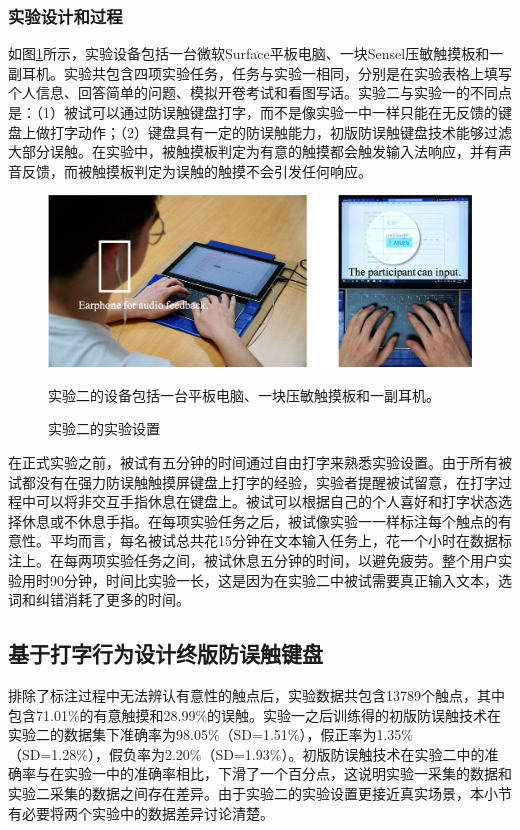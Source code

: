 \subsubsection{实验设计和过程}

如图\ref{fig:TypeBoard_study2_illu}所示，实验设备包括一台微软Surface平板电脑、一块Sensel压敏触摸板和一副耳机。实验共包含四项实验任务，任务与实验一相同，分别是在实验表格上填写个人信息、回答简单的问题、模拟开卷考试和看图写话。实验二与实验一的不同点是：（1）被试可以通过防误触键盘打字，而不是像实验一中一样只能在无反馈的键盘上做打字动作；（2）键盘具有一定的防误触能力，初版防误触键盘技术能够过滤大部分误触。在实验中，被触摸板判定为有意的触摸都会触发输入法响应，并有声音反馈，而被触摸板判定为误触的触摸不会引发任何响应。

\begin{figure}[!tbh]
	\includegraphics[width=1.0\linewidth]{figures/TypeBoard_study2_illu.png}
	\centering
	\caption*{实验二的设备包括一台平板电脑、一块压敏触摸板和一副耳机。}
	\caption{实验二的实验设置}
	\label{fig:TypeBoard_study2_illu}
\end{figure}

在正式实验之前，被试有五分钟的时间通过自由打字来熟悉实验设置。由于所有被试都没有在强力防误触触摸屏键盘上打字的经验，实验者提醒被试留意，在打字过程中可以将非交互手指休息在键盘上。被试可以根据自己的个人喜好和打字状态选择休息或不休息手指。在每项实验任务之后，被试像实验一一样标注每个触点的有意性。平均而言，每名被试总共花15分钟在文本输入任务上，花一个小时在数据标注上。在每两项实验任务之间，被试休息五分钟的时间，以避免疲劳。整个用户实验用时90分钟，时间比实验一长，这是因为在实验二中被试需要真正输入文本，选词和纠错消耗了更多的时间。

\subsection{基于打字行为设计终版防误触键盘}

排除了标注过程中无法辨认有意性的触点后，实验数据共包含13789个触点，其中包含71.01\%的有意触摸和28.99\%的误触。实验一之后训练得的初版防误触技术在实验二的数据集下准确率为98.05\%（SD=1.51\%），假正率为1.35\%（SD=1.28\%），假负率为2.20\%（SD=1.93\%）。初版防误触技术在实验二中的准确率与在实验一中的准确率相比，下滑了一个百分点，这说明实验一采集的数据和实验二采集的数据之间存在差异。由于实验二的实验设置更接近真实场景，本小节有必要将两个实验中的数据差异讨论清楚。

